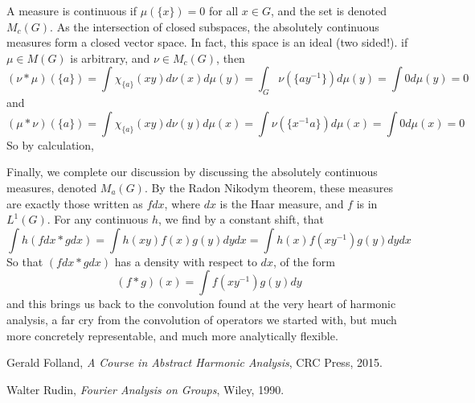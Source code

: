 \documentclass{article}
\theoremstyle{plain}
\theoremstyle{definition}
\begin{document}
A measure is continuous if $\mu(\{x\}) = 0$ for all $x \in G$, and the set is denoted $M_c(G)$. As the intersection of closed subspaces, the absolutely continuous measures form a closed vector space. In fact, this space is an ideal (two sided!). if $\mu \in M(G)$ is arbitrary, and $\nu \in M_c(G)$, then
%
\[ (\nu * \mu)(\{ a \}) = \int \chi_{\{ a \}}(xy) d\nu(x) d\mu(y) = \int_G \nu(\{ ay^{-1} \}) d\mu(y) = \int 0 d\mu(y) = 0 \]
%
and
%
\[ (\mu * \nu)(\{ a \}) = \int \chi_{\{ a \}}(xy) d\nu(y) d\mu(x) = \int \nu( \{ x^{-1}a \}) d\mu(x) = \int 0 d\mu(x) = 0 \]
%
So by calculation,

Finally, we complete our discussion by discussing the absolutely continuous measures, denoted $M_a(G)$. By the Radon Nikodym theorem, these measures are exactly those written as $f dx$, where $dx$ is the Haar measure, and $f$ is in $L^1(G)$. For any continuous $h$, we find by a constant shift, that
%
\[ \int h (f dx * g dx) = \int h(xy) f(x) g(y) dy dx = \int h(x) f(xy^{-1}) g(y) dy dx \]
%
So that $(f dx * g dx)$ has a density with respect to $dx$, of the form
%
\[ (f * g)(x) = \int f(xy^{-1}) g(y) dy \]
%
and this brings us back to the convolution found at the very heart of harmonic analysis, a far cry from the convolution of operators we started with, but much more concretely representable, and much more analytically flexible.

\begin{thebibliography}{9}

    Gerald Folland,
    \emph{A Course in Abstract Harmonic Analysis},
    CRC Press,
    2015.

    Walter Rudin,
    \emph{Fourier Analysis on Groups},
    Wiley,
    1990.

\end{thebibliography}
\end{document}
